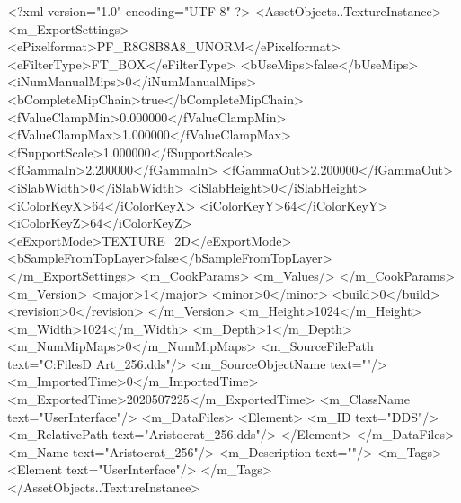 <?xml version="1.0" encoding="UTF-8" ?>
<AssetObjects..TextureInstance>
	<m_ExportSettings>
		<ePixelformat>PF_R8G8B8A8_UNORM</ePixelformat>
		<eFilterType>FT_BOX</eFilterType>
		<bUseMips>false</bUseMips>
		<iNumManualMips>0</iNumManualMips>
		<bCompleteMipChain>true</bCompleteMipChain>
		<fValueClampMin>0.000000</fValueClampMin>
		<fValueClampMax>1.000000</fValueClampMax>
		<fSupportScale>1.000000</fSupportScale>
		<fGammaIn>2.200000</fGammaIn>
		<fGammaOut>2.200000</fGammaOut>
		<iSlabWidth>0</iSlabWidth>
		<iSlabHeight>0</iSlabHeight>
		<iColorKeyX>64</iColorKeyX>
		<iColorKeyY>64</iColorKeyY>
		<iColorKeyZ>64</iColorKeyZ>
		<eExportMode>TEXTURE_2D</eExportMode>
		<bSampleFromTopLayer>false</bSampleFromTopLayer>
	</m_ExportSettings>
	<m_CookParams>
		<m_Values/>
	</m_CookParams>
	<m_Version>
		<major>1</major>
		<minor>0</minor>
		<build>0</build>
		<revision>0</revision>
	</m_Version>
	<m_Height>1024</m_Height>
	<m_Width>1024</m_Width>
	<m_Depth>1</m_Depth>
	<m_NumMipMaps>0</m_NumMipMaps>
	<m_SourceFilePath text="C:\Users\Shadow\Desktop\Working Files\2D Art\Quarters\Aristocrat\Aristocrat_256.dds"/>
	<m_SourceObjectName text=""/>
	<m_ImportedTime>0</m_ImportedTime>
	<m_ExportedTime>2020507225</m_ExportedTime>
	<m_ClassName text="UserInterface"/>
	<m_DataFiles>
		<Element>
			<m_ID text="DDS"/>
			<m_RelativePath text="Aristocrat_256.dds"/>
		</Element>
	</m_DataFiles>
	<m_Name text="Aristocrat_256"/>
	<m_Description text=""/>
	<m_Tags>
		<Element text="UserInterface"/>
	</m_Tags>
</AssetObjects..TextureInstance>

